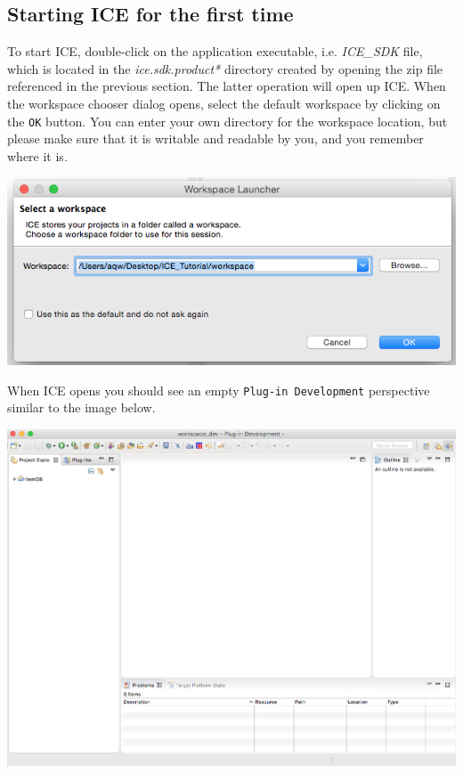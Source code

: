 \subsection{Starting ICE for the first time}
To start ICE, double-click on the application executable, i.e. \textit{ICE_SDK} file, which is located in the \textit{ice.sdk.product*} directory created by opening the zip file referenced in the previous section. The latter operation will open up ICE. When the workspace chooser dialog opens, select the default workspace by clicking on the \texttt{OK} button.
You can enter your own directory for the workspace location, but please make sure that it is writable and readable by you, and you remember where it is.
\begin{center} \includegraphics[width=\textwidth]{figures/workspace}
\end{center}
When ICE opens you should see an empty \texttt{Plug-in Development} perspective
similar to the image below.
\begin{center} \includegraphics[width=\textwidth]{figures/expectedICE}
\end{center} 

